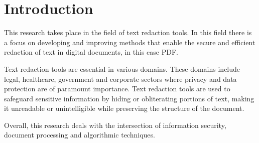\section{Introduction}
\label{sec:introduction}

This research takes place in the field of text redaction tools. In this field there is a focus on developing and improving methods that enable the secure and efficient redaction of text in digital documents, in this case PDF. 

Text redaction tools are essential in various domains. These domains include legal, healthcare, government and corporate sectors where privacy and data protection are of paramount importance. Text redaction tools are used to safeguard sensitive information by hiding or obliterating portions of text, making it unreadable or unintelligible while preserving the structure of the document.

Overall, this research deals with the intersection of information security, document processing and algorithmic techniques.